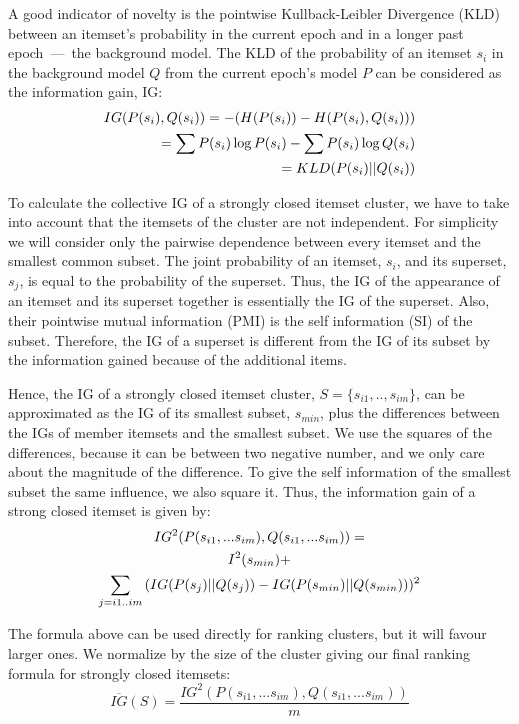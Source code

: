 \documentclass[letterpaper,12pt,titlepage,oneside,final]{book}
\begin{document}
A good indicator of novelty is the pointwise Kullback-Leibler Divergence (KLD)
between an itemset's probability in the current epoch and in a longer past
epoch~---~the background model.
The KLD of the probability of an itemset $s_i$ in the background
model $Q$ from the current epoch's model $P$ can be considered as
the information gain, IG: 
\begin{align}IG(P(s_i),Q(s_i))  = - (H(P(s_i)) - H(P(s_i),Q(s_i))) \notag\\ = \sum{P(s_i) \log{P(s_i)}} - \sum{P(s_i) \log{Q(s_i)}} \notag\\ = KLD(P(s_i)||Q(s_i))\end{align}

To calculate the collective IG of a strongly closed itemset cluster,
we have to take into account that the itemsets of the cluster are not independent. 
For simplicity we will consider only the pairwise dependence between 
every itemset and the smallest common subset.
The joint probability of an itemset, $s_i$, and its superset,
$s_j$, is equal to the probability of the superset.
Thus, the IG of the appearance of an itemset and its superset
together is essentially the IG of the superset.
Also, their pointwise mutual information (PMI) is the self information (SI) of
the subset. Therefore, the IG of a superset is different from the
IG of its subset by the information gained because
of the additional items. 

Hence, the IG of a strongly closed itemset cluster,
$S=\{s_{i1},..,s_{im}\}$, 
can be approximated as the IG of its smallest subset, $s_{min}$,
plus the differences between the IGs of member itemsets and the smallest subset.
We use the squares of the differences, because it can be between two negative number, and we only care about the magnitude of the difference.
To give the self information of the smallest subset the same influence,
we also square it.
Thus, the information gain of a strong closed itemset is given by:
\begin{multline}IG^2(P(s_{i1},...s_{im}),Q(s_{i1},...s_{im})) =\notag\\ I^2(s_{min}) + \notag\\ 
\sum_{j = i1..im}{(IG(P(s_j)||Q(s_j)) - IG(P(s_{min})||Q(s_{min})))^{2}} \end{multline}

The formula above can be used directly for ranking clusters,
but it will favour larger ones.
We normalize by the size of the cluster giving our final ranking formula for
strongly closed itemsets:
\begin{equation}\label{eq:avgIG}\overline{IG}(S) = \frac{IG^2(P(s_{i1},...s_{im}),Q(s_{i1},...s_{im}))}{m}\end{equation}
\end{document}
